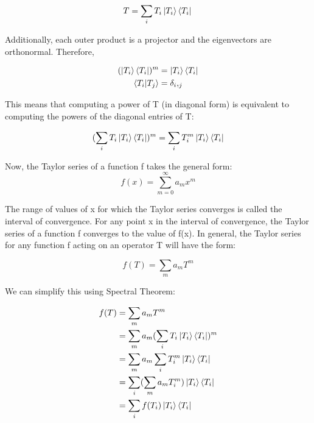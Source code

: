 \documentclass[12pt]{article}
\begin{document}
\begin{equation}
     T = \sum_{i} T_i\ket{T_i}\bra{T_i} \\
\end{equation}

Additionally, each outer product is a projector and the eigenvectors are orthonormal. Therefore,

\begin{equation}
\begin{aligned}
    (\ket{T_i}\bra{T_i})^m &= \ket{T_i}\bra{T_i} \\
    \braket{T_i| T_j} &= \delta_i,_j
\end{aligned}
\end{equation}

This means that computing a power of T (in diagonal form) is equivalent to computing the powers of the diagonal entries of T:

\begin{equation}
    (\sum_{i}T_i \ket{T_i} \bra{T_i})^m = \sum_{i}T_i^m \ket{T_i} \bra{T_i}
\end{equation}

Now, the Taylor series of a function f takes the general form:
\begin{equation}
    f(x) = \sum^{\infty}_{m=0} a_m x^m
\end{equation}

The range of values of x for which the Taylor series converges is called the interval of convergence. For any point x in the interval of convergence, the Taylor series of a function f converges to the value of f(x). In general, the Taylor series for any function f acting on an operator T will have the form:

\begin{equation}
    f(T) = \sum_{m} a_m T^m
\end{equation}

We can simplify this using Spectral Theorem:

\begin{equation}
\begin{split}
    f(T) &= \sum_{m} a_m T^m \\
    &= \sum_{m} a_m (\sum_{i} T_i \ket{T_i}\bra{T_i})^m \\
    &= \sum_{m} a_m \sum_{i} T_i^m \ket{T_i}\bra{T_i} \\
    &= \sum_i (\sum_m a_m T_i^m) \ket{T_i}\bra{T_i} \\
    &= \sum_i f(T_i) \ket{T_i} \bra{T_i}
\end{split}
\end{equation}
\end{document}
